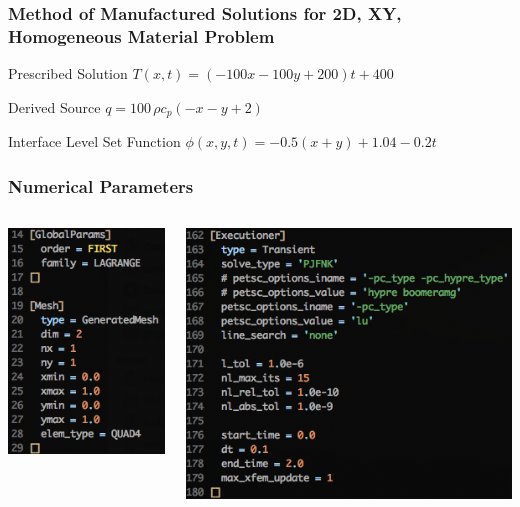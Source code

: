 \documentclass[]{beamer}
\begin{document}
\begin{frame}[t]\frametitle{Method of Manufactured Solutions for 2D, XY, Homogeneous Material Problem}
  \begin{block}{Prescribed Solution}
    $T(x,t) = (-100x-100y+200)t + 400$
  \end{block}
  
  \begin{block}{Derived Source}
  $q = 100\,\rho c_p \left(-x-y+2\right)$
  \end{block}
  
  \begin{block}{Interface Level Set Function}
    $\phi(x,y,t) = -0.5(x+y) + 1.04 - 0.2t$
  \end{block}
\end{frame}

\begin{frame}\frametitle{Numerical Parameters}
  	\begin{columns}
			\begin{center}
			\includegraphics[scale=0.4]{figures/Screen-GlobalParams-2Dxyh1m}
			\end{center}
			\begin{center}
			\includegraphics[scale=0.4]{figures/Screen-Executioner-2Dxyh1m}

\end{center}
\end{columns}
\end{frame}
\end{document}
